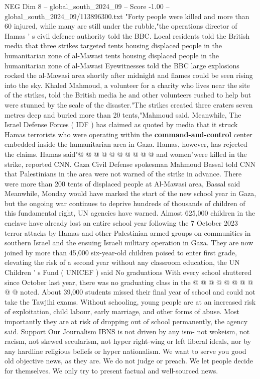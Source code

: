 \begin{textsample}{NEG Dim 8 – global\_south\_2024\_09 – Score -1.00 – global\_south\_2024\_09/113896300.txt}  \label{ex:f8_neg_162}
"Forty people were killed and more than 60 injured, while many are still under the rubble,"the operations director of Hamas ' s civil defence authority told the BBC.
Local residents told the British media that three strikes targeted tents housing displaced people in the humanitarian zone of al-Mawasi tents housing displaced people in the humanitarian zone of al-Mawasi Eyewitnesses told the BBC large explosions rocked the al-Mawasi area shortly after midnight and flames could be seen rising into the sky.
Khaled Mahmoud, a volunteer for a charity who lives near the site of the strikes, told the British media he and other volunteers rushed to help but were stunned by the scale of the disaster."The strikes created three craters seven metres deep and buried more than 20 tents,"Mahmoud said.
Meanwhile, The Israel Defense Forces ( IDF ) has claimed as quoted by media that it struck Hamas terrorists who were operating within the \textbf{command-and-control} center embedded inside the humanitarian area in Gaza.
Hamas, however, has rejected the claims.
Hamas said"@ @ @ @ @ @ @ @ @ @ and women"were killed in the strike, reported CNN.
Gaza Civil Defense spokesman Mahmoud Bassal told CNN that Palestinians in the area were not warned of the strike in advance.
There were more than 200 tents of displaced people at Al-Mawasi area, Bassal said Meanwhile, Monday would have marked the start of the new school year in Gaza, but the ongoing war continues to deprive hundreds of thousands of children of this fundamental right, UN agencies have warned.
Almost 625,000 children in the enclave have already lost an entire school year following the 7 October 2023 terror attacks by Hamas and other Palestinian armed groups on communities in southern Israel and the ensuing Israeli military operation in Gaza.
They are now joined by more than 45,000 six-year-old children poised to enter first grade, elevating the risk of a second year without any classroom education, the UN Children ' s Fund ( UNICEF ) said No graduations With every school shuttered since October last year, there was no graduating class in the @ @ @ @ @ @ @ @ @ @ noted.
About 39,000 students missed their final year of school and could not take the Tawjihi exams.
Without schooling, young people are at an increased risk of exploitation, child labour, early marriage, and other forms of abuse.
Most importantly they are at risk of dropping out of school permanently, the agency said.
Support Our Journalism IBNS is not driven by any ism- not wokeism, not racism, not skewed secularism, not hyper right-wing or left liberal ideals, nor by any hardline religious beliefs or hyper nationalism.
We want to serve you good old objective news, as they are.
We do not judge or preach.
We let people decide for themselves.
We only try to present factual and well-sourced news.

\end{textsample}
